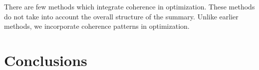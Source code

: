 There are few methods \cite{hirao13,parveen15a,gorinski15} which integrate coherence in optimization.
These methods do not take into account the overall structure of the summary. Unlike earlier methods, we incorporate coherence patterns in optimization.


\section{Conclusions}
\label{sec:conclusions}

